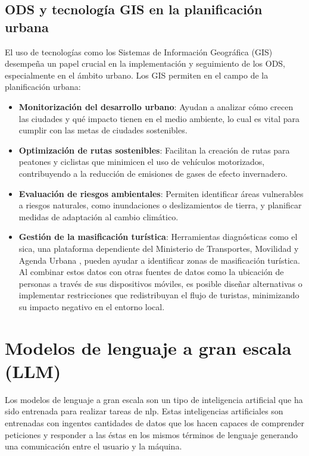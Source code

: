 	\subsection{ODS y tecnología GIS en la planificación urbana}
	El uso de tecnologías como los Sistemas de Información Geográfica (GIS) desempeña un papel crucial en la implementación y seguimiento de los ODS, especialmente en el ámbito urbano. Los GIS permiten en el campo de la planificación urbana:
	\begin{itemize}
		\item \textbf{Monitorización del desarrollo urbano}: Ayudan a analizar cómo crecen las ciudades y qué impacto tienen en el medio ambiente, lo cual es vital para cumplir con las metas de ciudades sostenibles.
		
		\item \textbf{Optimización de rutas sostenibles}: Facilitan la creación de rutas para peatones y ciclistas que minimicen el uso de vehículos motorizados, contribuyendo a la reducción de emisiones de gases de efecto invernadero.
		
		\item \textbf{Evaluación de riesgos ambientales}: Permiten identificar áreas vulnerables a riesgos naturales, como inundaciones o deslizamientos de tierra, y planificar medidas de adaptación al cambio climático.
		
		\item \textbf{Gestión de la masificación turística}: Herramientas diagnósticas como el \acrfull{sica}, una plataforma dependiente del Ministerio de Transportes, Movilidad y Agenda Urbana \cite{sica_mapa_ruido}, pueden ayudar a identificar zonas de masificación turística. Al combinar estos datos con otras fuentes de datos como la ubicación de personas a través de sus dispositivos móviles, es posible diseñar alternativas o implementar restricciones que redistribuyan el flujo de turistas, minimizando su impacto negativo en el entorno local.
 
		
	\end{itemize}
	

\section{Modelos de lenguaje a gran escala (LLM)}
Los modelos de lenguaje a gran escala son un tipo de inteligencia artificial que ha sido entrenada para realizar tareas de \acrfull{nlp}. Estas inteligencias artificiales son entrenadas con ingentes cantidades de datos que los hacen capaces de comprender peticiones y responder a las éstas en los mismos términos de lenguaje generando una comunicación entre el usuario y la máquina.
	
